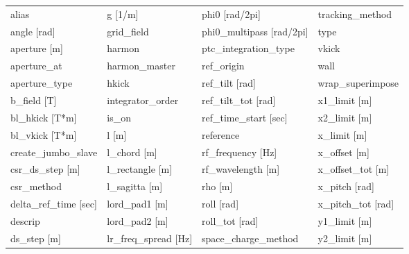  \begin{tabular}{llll} \toprule
alias                            & g [1/m]                          & phi0 [rad/2pi]                   & tracking_method                  \\
angle [rad]                      & grid_field                       & phi0_multipass [rad/2pi]         & type                             \\
aperture [m]                     & harmon                           & ptc_integration_type             & vkick                            \\
aperture_at                      & harmon_master                    & ref_origin                       & wall                             \\
aperture_type                    & hkick                            & ref_tilt [rad]                   & wrap_superimpose                 \\
b_field [T]                      & integrator_order                 & ref_tilt_tot [rad]               & x1_limit [m]                     \\
bl_hkick [T*m]                   & is_on                            & ref_time_start [sec]             & x2_limit [m]                     \\
bl_vkick [T*m]                   & l [m]                            & reference                        & x_limit [m]                      \\
create_jumbo_slave               & l_chord [m]                      & rf_frequency [Hz]                & x_offset [m]                     \\
csr_ds_step [m]                  & l_rectangle [m]                  & rf_wavelength [m]                & x_offset_tot [m]                 \\
csr_method                       & l_sagitta [m]                    & rho [m]                          & x_pitch [rad]                    \\
delta_ref_time [sec]             & lord_pad1 [m]                    & roll [rad]                       & x_pitch_tot [rad]                \\
descrip                          & lord_pad2 [m]                    & roll_tot [rad]                   & y1_limit [m]                     \\
ds_step [m]                      & lr_freq_spread [Hz]              & space_charge_method              & y2_limit [m]                     \\

\end{tabular}
